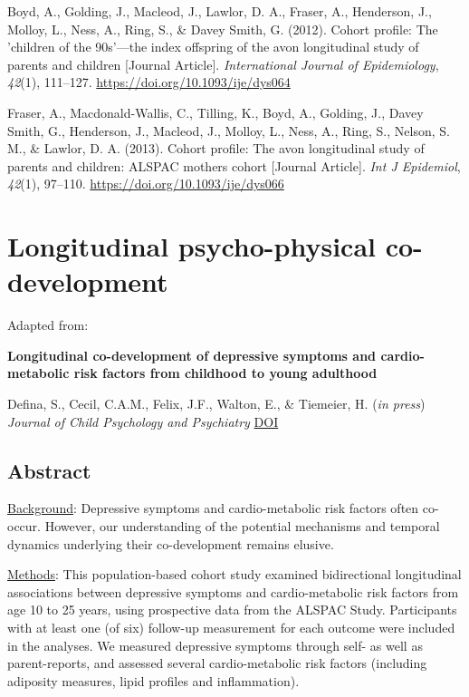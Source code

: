 \documentclass[
  letterpaper,
  DIV=11,
  numbers=noendperiod]{scrreport}
\newlength{\cslhangindent}
\newenvironment{CSLReferences}[2] %
 {\begin{list}{}{%
  \setlength{\itemindent}{0pt}
  \setlength{\leftmargin}{0pt}
  \setlength{\parsep}{0pt}
  \ifodd #1
   \setlength{\leftmargin}{\cslhangindent}
   \setlength{\itemindent}{-1\cslhangindent}
  \fi
  \setlength{\itemsep}{#2\baselineskip}}}
 {\end{list}}
\begin{document}
\label{refs--5}
\begin{CSLReferences}{1}{0}
Boyd, A., Golding, J., Macleod, J., Lawlor, D. A., Fraser, A.,
Henderson, J., Molloy, L., Ness, A., Ring, S., \& Davey Smith, G.
(2012). Cohort profile: The 'children of the 90s'---the index offspring
of the avon longitudinal study of parents and children {[}Journal
Article{]}. \emph{International Journal of Epidemiology}, \emph{42}(1),
111--127. \url{https://doi.org/10.1093/ije/dys064}

Fraser, A., Macdonald-Wallis, C., Tilling, K., Boyd, A., Golding, J.,
Davey Smith, G., Henderson, J., Macleod, J., Molloy, L., Ness, A., Ring,
S., Nelson, S. M., \& Lawlor, D. A. (2013). Cohort profile: The avon
longitudinal study of parents and children: ALSPAC mothers cohort
{[}Journal Article{]}. \emph{Int J Epidemiol}, \emph{42}(1), 97--110.
\url{https://doi.org/10.1093/ije/dys066}

\end{CSLReferences}

\chapter{Longitudinal psycho-physical
co-development}\label{sec-chapter6}

Adapted from:

\textbf{Longitudinal co-development of depressive symptoms and
cardio-metabolic risk factors from childhood to young adulthood}

Defina, S., Cecil, C.A.M., Felix, J.F., Walton, E., \& Tiemeier, H.
(\emph{in press}) \emph{Journal of Child Psychology and Psychiatry}
\href{https://www.medrxiv.org/content/10.1101/2024.10.01.24314697v1}{DOI}

\section*{Abstract}\label{abstract-4}


\ul{Background}: Depressive symptoms and cardio-metabolic risk factors
often co-occur. However, our understanding of the potential mechanisms
and temporal dynamics underlying their co-development remains elusive.

\ul{Methods}: This population-based cohort study examined bidirectional
longitudinal associations between depressive symptoms and
cardio-metabolic risk factors from age 10 to 25 years, using prospective
data from the ALSPAC Study. Participants with at least one (of six)
follow-up measurement for each outcome were included in the analyses. We
measured depressive symptoms through self- as well as parent-reports,
and assessed several cardio-metabolic risk factors (including adiposity
measures, lipid profiles and inflammation).
\end{document}
